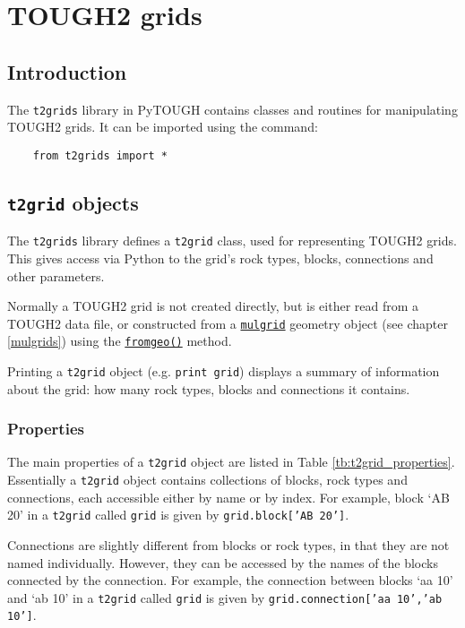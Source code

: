 \chapter{TOUGH2 grids}
\label{t2grids}

\section{Introduction}
The \texttt{t2grids} library in PyTOUGH contains classes and routines for manipulating TOUGH2 grids.  It can be imported using the command:

\begin{lstlisting}
    from t2grids import *
\end{lstlisting}

\section{\texttt{t2grid} objects}

The \texttt{t2grids} library defines a \texttt{t2grid} class, used for representing TOUGH2 grids.  This gives access via Python to the grid's rock types, blocks, connections and other parameters.

Normally a TOUGH2 grid is not created directly, but is either read from a TOUGH2 data file, or constructed from a \hyperref[mulgrids]{\texttt{mulgrid}} geometry object (see chapter \ref{mulgrids}) using the \hyperref[sec:t2grid:fromgeo]{\texttt{fromgeo()}} method.

Printing a \texttt{t2grid} object (e.g. \texttt{print grid}) displays a summary of information about the grid: how many rock types, blocks and connections it contains.

\subsection{Properties}

The main properties of a \texttt{t2grid} object are listed in Table \ref{tb:t2grid_properties}.  Essentially a \texttt{t2grid} object contains collections of blocks, rock types and connections, each accessible either by name or by index.  For example, block `AB 20' in a \texttt{t2grid} called \texttt{grid} is given by \texttt{grid.block['AB 20']}.

Connections are slightly different from blocks or rock types, in that they are not named individually.  However, they can be accessed by the names of the blocks connected by the connection.  For example, the connection between blocks `aa 10' and `ab 10' in a \texttt{t2grid} called \texttt{grid} is given by \texttt{grid.connection['aa 10','ab 10']}.


